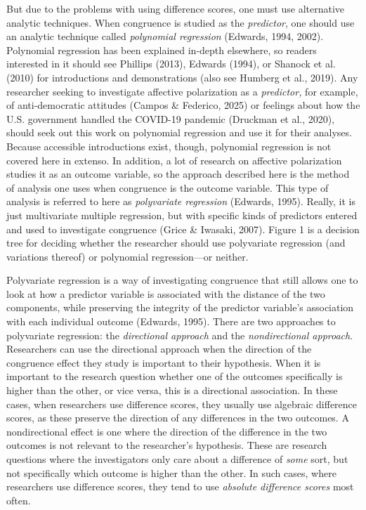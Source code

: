 \documentclass[authordate, meta]{jote-new-article}
\begin{document}
	But due to the problems with using difference scores, one must use alternative analytic techniques. When congruence is studied as the \emph{predictor}, one should use an analytic technique called \emph{polynomial regression} (Edwards, 1994, 2002). Polynomial regression has been explained in-depth elsewhere, so readers interested in it should see Phillips (2013), Edwards (1994), or Shanock et al. (2010) for introductions and demonstrations (also see Humberg et al., 2019). Any researcher seeking to investigate affective polarization as a \emph{predictor, }for example, of anti-democratic attitudes (Campos \& Federico, 2025) or feelings about how the U.S. government handled the COVID-19 pandemic (Druckman et al., 2020), should seek out this work on polynomial regression and use it for their analyses. Because accessible introductions exist, though, polynomial regression is not covered here in extenso. In addition, a lot of research on affective polarization studies it as an outcome variable, so the approach described here is the method of analysis one uses when congruence is the outcome variable. This type of analysis is referred to here as \emph{polyvariate regression }(Edwards, 1995). Really, it is just multivariate multiple regression, but with specific kinds of predictors entered and used to investigate congruence (Grice \& Iwasaki, 2007). Figure 1 is a decision tree for deciding whether the researcher should use polyvariate regression (and variations thereof) or polynomial regression—or neither.



	Polyvariate regression is a way of investigating congruence that still allows one to look at how a predictor variable is associated with the distance of the two components, while preserving the integrity of the predictor variable's association with each individual outcome (Edwards, 1995). There are two approaches to polyvariate regression: the \emph{directional approach} and the \emph{nondirectional approach}. Researchers can use the directional approach when the direction of the congruence effect they study is important to their hypothesis. When it is important to the research question whether one of the outcomes specifically is higher than the other, or vice versa, this is a directional association. In these cases, when researchers use difference scores, they usually use algebraic difference scores, as these preserve the direction of any differences in the two outcomes. A nondirectional effect is one where the direction of the difference in the two outcomes is not relevant to the researcher's hypothesis. These are research questions where the investigators only care about a difference of \emph{some }sort, but not specifically which outcome is higher than the other. In such cases, where researchers use difference scores, they tend to use \emph{absolute difference scores} most often.
\end{document}
